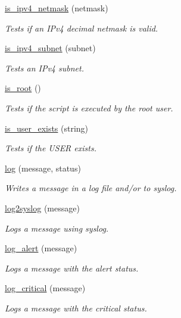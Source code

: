 \begin{DoxyCompactItemize}
\hyperlink{group__network_ga285bf1c0fa821c715d3dcfb730fb6c25}{is\+\_\+ipv4\+\_\+netmask} (netmask)
\begin{DoxyCompactList}\small\item\em Tests if an I\+Pv4 decimal netmask is valid. \end{DoxyCompactList}\item 
\hyperlink{group__network_gaf6be413099165a8bb76734dc07a874e7}{is\+\_\+ipv4\+\_\+subnet} (subnet)
\begin{DoxyCompactList}\small\item\em Tests an I\+Pv4 subnet. \end{DoxyCompactList}\item 
\hyperlink{group__usergroup_ga72b5a7005064e37d0e9547e0ede76263}{is\+\_\+root} ()
\begin{DoxyCompactList}\small\item\em Tests if the script is executed by the root user. \end{DoxyCompactList}\item 
\hyperlink{group__usergroup_ga7e5c33e61b98a256c7489150cf4e14bc}{is\+\_\+user\+\_\+exists} (string)
\begin{DoxyCompactList}\small\item\em Tests if the U\+S\+ER exists. \end{DoxyCompactList}\item 
\hyperlink{group__log_ga037d4a587495695fb9072697bd3b2a1c}{log} (message, status)
\begin{DoxyCompactList}\small\item\em Writes a message in a log file and/or to syslog. \end{DoxyCompactList}\item 
\hyperlink{group__log_ga7d0774857ae14ce00dac9e9cb4183ed8}{log2syslog} (message)
\begin{DoxyCompactList}\small\item\em Logs a message using syslog. \end{DoxyCompactList}\item 
\hyperlink{group__log_ga36dd3783b9386bf202d2c81c24470466}{log\+\_\+alert} (message)
\begin{DoxyCompactList}\small\item\em Logs a message with the \textquotesingle{}alert\textquotesingle{} status. \end{DoxyCompactList}\item 
\hyperlink{group__log_ga2f066e08ce5a304ebadeb744a1a48841}{log\+\_\+critical} (message)
\begin{DoxyCompactList}\small\item\em Logs a message with the \textquotesingle{}critical\textquotesingle{} status. \end{DoxyCompactList}\item 

\end{DoxyCompactItemize}
